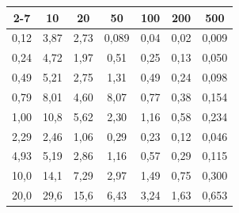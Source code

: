 \begin{table}
\begin{center}
\begin{tabular}{|c|c|c|c|c|c|c|}
\cline{2-7}


& 10 & 20 & 50 & 100 & 200 & 500\\


 \hline


 0{,}12 & 3{,}87 & 2{,}73 & 0{,}089 & 0{,}04 & 0{,}02 & 0{,}009 \\




 0{,}24 & 4{,}72 & 1{,}97 & 0{,}51 & 0{,}25 & 0{,}13 & 0{,}050 \\




 0{,}49 & 5{,}21 & 2{,}75 & 1{,}31 & 0{,}49 & 0{,}24 & 0{,}098 \\




 0{,}79 & 8{,}01 & 4{,}60 & 8{,}07 & 0{,}77 & 0{,}38 & 0{,}154 \\




 1{,}00 & 10{,}8 & 5{,}62 & 2{,}30 & 1{,}16 & 0{,}58 & 0{,}234 \\




 2{,}29 & 2{,}46 & 1{,}06 & 0{,}29 & 0{,}23 & 0{,}12 & 0{,}046 \\




 4{,}93 & 5{,}19 & 2{,}86 & 1{,}16 & 0{,}57 & 0{,}29 & 0{,}115 \\




 10{,}0 & 14{,}1 & 7{,}29 & 2{,}97 & 1{,}49 & 0{,}75 & 0{,}300 \\




 20{,}0 & 29{,}6 & 15{,}6 & 6{,}43 & 3{,}24 & 1{,}63 & 0{,}653\\


  \hline


\end{tabular}


\end{center}


\vspace*{18pt}


\end{table}





